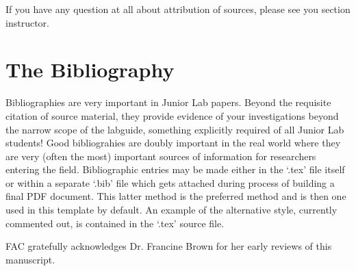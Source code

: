 If you have any question at all about attribution of sources, please
see you section instructor.
\section{The Bibliography}
Bibliographies are very important in Junior Lab papers.  Beyond the
requisite citation of source material, they provide
evidence of your investigations beyond the narrow scope of the
labguide, something explicitly required of all Junior
Lab students!  Good bibliograhies are doubly important in the real
world where they are very (often the most) important sources
of information for researchers entering the field.  Bibliographic
entries may be made either in the `.tex' file itself or within a
separate `.bib' file which gets attached during process of building a
final PDF document.  This latter method is the preferred method and is
then one used in this template by default.  An example of the
alternative style, currently commented out,  is contained in the `.tex' source file.




%


\begin{acknowledgments} FAC gratefully acknowledges Dr. Francine Brown for
her early reviews of this manuscript.
\end{acknowledgments}

\clearpage
\appendix



